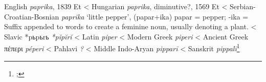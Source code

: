 \begin{etymology}\label{ety:paprika}
English \textit{paprika}, 1839 Et
< Hungarian \textit{paprika}, diminutive?, 1569 Et
< Serbian-Croatian-Bosnian \textit{paprika} `little pepper', (papar+ika) papar = pepper; -ika = Suffix appended to words to create a feminine noun, usually denoting a plant.
< Slavic {*pьpьrь} \textit{*pĭpĭrĭ }
< Latin \textit{piper}
< Modern Greek \textit{piperi}
< Ancient Greek {πέπερι} \textit{péperi}
< Pahlavi \textit{?}
< Middle Indo-Aryan \textit{pipparī}
< Sanskrit \textit{pippalī}\footnote{; }
\end{etymology}